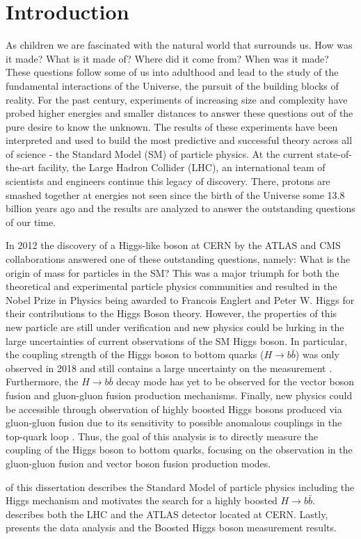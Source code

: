 \chapter{Introduction} \label{sec:intro}
As children we are fascinated with the natural world that surrounds us.  How
was it made? What is it made of? Where did it come from?  When was it made?
These questions follow some of us into adulthood and lead to the study of the
fundamental interactions of the Universe, the pursuit of the building blocks of
reality.  For the past century, experiments of increasing size and complexity
have probed higher energies and smaller distances to answer these questions out
of the pure desire to know the unknown.  The results of these experiments have
been interpreted and used to build the most predictive and successful theory
across all of science - the Standard Model (SM) of particle physics. At the
current state-of-the-art facility, the Large Hadron Collider (LHC), an
international team of scientists and engineers continue this legacy of
discovery.  There, protons are smashed together at energies not seen since the
birth of the Universe some 13.8 billion years ago and the results are analyzed
to answer the outstanding questions of our time.

In 2012 the discovery of a Higgs-like boson \cite{Higgs:1964ia, Higgs:1964pj,
Higgs:1966ev, Englert:1964et, Guralnik:1964eu} at CERN by the ATLAS and CMS
\cite{Aad:2012tfa,Chatrchyan:2012xdj} collaborations answered one of these
outstanding questions, namely: What is the origin of mass for particles in the
SM?  This was a major triumph for both the theoretical and experimental
particle physics communities and resulted in the Nobel Prize in Physics being
awarded to Francois Englert and Peter W. Higgs for their contributions to the
Higgs Boson theory. However, the properties of this new particle are still
under verification and new physics could be lurking in the large uncertainties
of current observations of the SM Higgs boson.  In particular, the coupling
strength of the Higgs boson to bottom quarks ($H \rightarrow b\bar{b}$) was
only observed in 2018 and still contains a large uncertainty on the measurement
\cite{HIGG-2018-04, CMS:2018abb}. Furthermore, the $H \rightarrow b\bar{b}$
decay mode has yet to be observed for the vector boson fusion and gluon-gluon
fusion production mechanisms.  Finally, new physics could be accessible through
observation of highly boosted Higgs bosons produced via gluon-gluon fusion due
to its sensitivity to possible anomalous couplings in the top-quark loop
\cite{Grojean:2013nya, Schlaffer:2014osa}.  Thus, the goal of this analysis is
to directly measure the coupling of the Higgs boson to bottom quarks, focusing
on the observation in the gluon-gluon fusion and vector boson fusion production
modes. 

 of this dissertation describes the Standard Model of
particle physics including the Higgs mechanism and motivates the search for a
highly boosted $H \rightarrow b\bar{b}$.  describes both
the LHC and the ATLAS detector located at CERN. Lastly, 
presents the data analysis and the Boosted Higgs boson measurement results.
